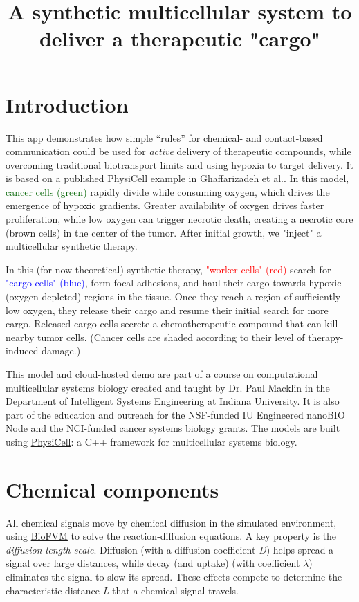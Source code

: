 \documentclass{article}
\begin{document}
\title{A synthetic multicellular system to deliver a therapeutic "cargo"}
\date{}
\author{}
\maketitle

\section{Introduction}
This app demonstrates how simple ``rules'' for chemical- and contact-based
communication could be used for \emph{active} delivery of therapeutic
compounds, while overcoming traditional biotransport limits and using
hypoxia to target delivery. It is based on a published PhysiCell example
in Ghaffarizadeh et al.\cite{physicell-2018}. In this model, \textcolor{darkgreen}{cancer cells
(green)} rapidly divide while consuming oxygen, which drives the
emergence of hypoxic gradients. Greater availability of oxygen drives
faster proliferation, while low oxygen can trigger necrotic death,
creating a necrotic core ({brown cells}) in the center of the tumor.
After initial growth, we "inject" a multicellular synthetic therapy.

In this (for now theoretical) synthetic therapy, \textcolor{red}{"worker cells" (red)}
search for \textcolor{blue}{"cargo cells" (blue)}, form focal adhesions, and haul their
cargo towards hypoxic (oxygen-depleted) regions in the tissue. Once they
reach a region of sufficiently low oxygen, they release their cargo and
resume their initial search for more cargo. Released cargo cells secrete
a chemotherapeutic compound that can kill nearby tumor cells. (Cancer
cells are shaded according to their level of therapy-induced damage.)

This model and cloud-hosted demo are part of a course on computational
multicellular systems biology created and taught by Dr. Paul Macklin in
the Department of Intelligent Systems Engineering at Indiana University.
It is also part of the education and outreach for the NSF-funded IU Engineered
nanoBIO Node and the NCI-funded cancer systems biology grants.
The models are built using
\href{https://journals.plos.org/ploscompbiol/article?id=10.1371/journal.pcbi.1005991}{PhysiCell}:
a C++ framework for multicellular systems biology.

\section{Chemical components}
All chemical signals move by chemical diffusion in the simulated
environment, using
\href{http://dx.doi.org/10.1093/bioinformatics/btv730}{BioFVM}\cite{Ghaffarizadeh2016-ga}
to solve the reaction-diffusion equations. A key property is the
\emph{diffusion length scale}. Diffusion (with a diffusion coefficient
\emph{D}) helps spread a signal over large distances, while decay (and
uptake) (with coefficient $\lambda$) eliminates the signal to slow its
spread. These effects compete to determine the characteristic distance
\emph{L} that a chemical signal travels.
\end{document}
